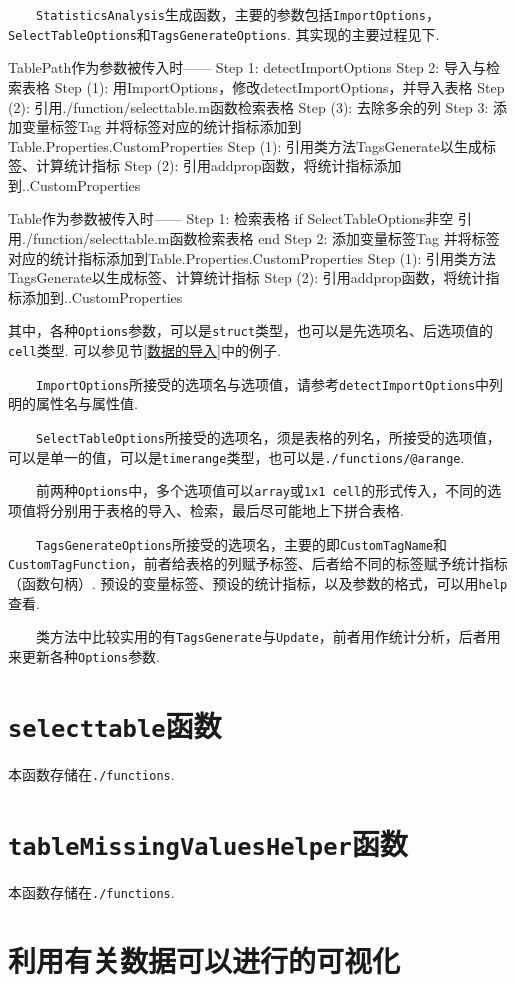 \documentclass[a4paper, titlepage]{article}
\begin{document}
    　　\texttt{StatisticsAnalysis}生成函数，主要的参数包括\texttt{ImportOptions}，\texttt{SelectTableOptions}和\texttt{TagsGenerateOptions}. 其实现的主要过程见下.
\begin{matlabcode}
TablePath作为参数被传入时——
Step 1: detectImportOptions
Step 2: 导入与检索表格
    Step (1): 用ImportOptions，修改detectImportOptions，并导入表格
    Step (2): 引用./function/selecttable.m函数检索表格
    Step (3): 去除多余的列
Step 3: 添加变量标签Tag
        并将标签对应的统计指标添加到Table.Properties.CustomProperties
    Step (1): 引用类方法TagsGenerate以生成标签、计算统计指标
    Step (2): 引用addprop函数，将统计指标添加到..CustomProperties
\end{matlabcode}
\begin{matlabcode}
Table作为参数被传入时——
Step 1: 检索表格
    if SelectTableOptions非空
        引用./function/selecttable.m函数检索表格
    end
Step 2: 添加变量标签Tag
        并将标签对应的统计指标添加到Table.Properties.CustomProperties
    Step (1): 引用类方法TagsGenerate以生成标签、计算统计指标
    Step (2): 引用addprop函数，将统计指标添加到..CustomProperties
\end{matlabcode}
    其中，各种\texttt{Options}参数，可以是\texttt{struct}类型，也可以是先选项名、后选项值的\texttt{cell}类型. 可以参见节\ref{数据的导入}中的例子.

    　　\texttt{ImportOptions}所接受的选项名与选项值，请参考\texttt{detectImportOptions}中列明的属性名与属性值.

    　　\texttt{SelectTableOptions}所接受的选项名，须是表格的列名，所接受的选项值，可以是单一的值，可以是\texttt{timerange}类型，也可以是\texttt{./functions/@arange}.

    　　前两种\texttt{Options}中，多个选项值可以\texttt{array}或\texttt{1x1 cell}的形式传入，不同的选项值将分别用于表格的导入、检索，最后尽可能地上下拼合表格.

    　　\texttt{TagsGenerateOptions}所接受的选项名，主要的即\texttt{CustomTagName}和\texttt{CustomTagFunction}，前者给表格的列赋予标签、后者给不同的标签赋予统计指标（函数句柄）. 预设的变量标签、预设的统计指标，以及参数的格式，可以用\texttt{help}查看.

    　　类方法中比较实用的有\texttt{TagsGenerate}与\texttt{Update}，前者用作统计分析，后者用来更新各种\texttt{Options}参数.

    \section{\texttt{selecttable}函数}\label{app:selecttable}
    本函数存储在\texttt{./functions}.
    \section{\texttt{tableMissingValuesHelper}函数}\label{app:tableMissingValuesHelper}
    本函数存储在\texttt{./functions}.
    \section{利用有关数据可以进行的可视化}
\end{document}
